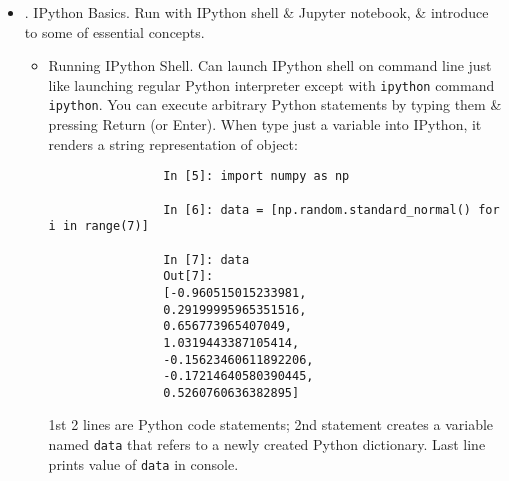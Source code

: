 \documentclass{article}
\begin{document}
\begin{itemize}
\begin{itemize}
		Running Python programs is as simple as calling {\tt python} with a {\tt.py} file as its 1st argument.
		
		While some Python programmers execute all of their Python code in this way, those doing data analysis or scientific computing make use of IPython, an enhanced Python interpreter, or Jupyter notebooks, web-based code notebooks originally created within IPython project. Give an introduction to using IPython \& Jupyter in this chap \& have included a deeper look at IPython functionality in Appendix A. When use \verb|%run| command, IPython executes code in specified file in same process, enabling to explore results interactively when it's done:
		\begin{verbatim}
			(pydata-book) nqbh@nqbh-dell:~$ ipython                            
			Python 3.12.7 | packaged by conda-forge | (main, Oct  4 2024, 16:05:46) [GCC 13.3.0]                                                                                Type 'copyright', 'credits' or 'license' for more information      
			IPython 8.31.0 -- An enhanced Interactive Python. Type '?' for help.                                                                                                In [1]: %run hello_world.py
			Hello world
			
			In [2]:
		\end{verbatim}
		Default IPython prompt adopts numbered {\tt In [2]:} style, cf. standard {\tt>>>} prompt.
		\item {. IPython Basics.} Run with IPython shell \& Jupyter notebook, \& introduce to some of essential concepts.
		\begin{itemize}
			\item {\sf Running IPython Shell.} Can launch IPython shell on command line just like launching regular Python interpreter except with {\tt ipython} command {\tt ipython}. You can execute arbitrary Python statements by typing them \& pressing Return (or Enter). When type just a variable into IPython, it renders a string representation of object:
			\begin{verbatim}
				In [5]: import numpy as np
				
				In [6]: data = [np.random.standard_normal() for i in range(7)]
				
				In [7]: data
				Out[7]: 
				[-0.960515015233981,
				0.29199995965351516,
				0.656773965407049,
				1.0319443387105414,
				-0.15623460611892206,
				-0.17214640580390445,
				0.5260760636382895]
			\end{verbatim}
			1st 2 lines are Python code statements; 2nd statement creates a variable named {\tt data} that refers to a newly created Python dictionary. Last line prints value of {\tt data} in console.
			

\end{itemize}
\end{itemize}
\end{itemize}
\end{document}
